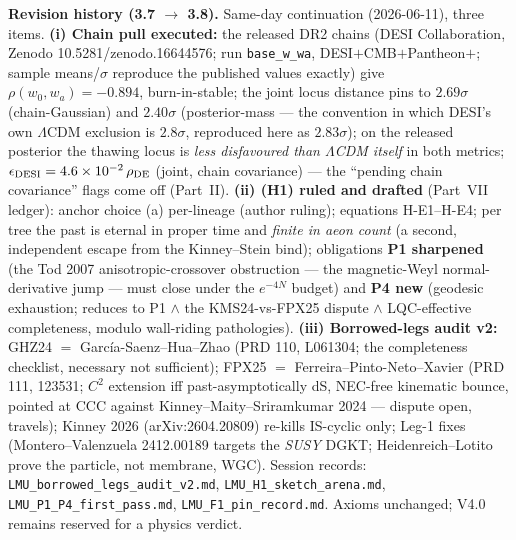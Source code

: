 \documentclass[11pt]{article}
\begin{document}
{\medskip
\noindent\textbf{Revision history (3.7 $\to$ 3.8).} Same-day continuation (2026-06-11), three items. \textbf{(i) Chain pull executed:} the released DR2 chains (DESI Collaboration, Zenodo 10.5281/zenodo.16644576; run \texttt{base\_w\_wa}, DESI$+$CMB$+$Pantheon$+$; sample means/$\sigma$ reproduce the published values exactly) give $\rho(w_0,w_a)=-0.894$, burn-in-stable; the joint locus distance pins to $2.69\sigma$ (chain-Gaussian) and $2.40\sigma$ (posterior-mass --- the convention in which DESI's own $\Lambda$CDM exclusion is $2.8\sigma$, reproduced here as $2.83\sigma$); on the released posterior the thawing locus is \emph{less disfavoured than $\Lambda$CDM itself} in both metrics; $\epsilon_{\rm DESI}=4.6\times10^{-2}\,\rho_{\rm DE}$ (joint, chain covariance) --- the ``pending chain covariance'' flags come off (Part~II). \textbf{(ii) (H1) ruled and drafted} (Part~VII ledger): anchor choice (a) per-lineage (author ruling); equations H-E1--H-E4; per tree the past is eternal in proper time and \emph{finite in aeon count} (a second, independent escape from the Kinney--Stein bind); obligations \textbf{P1 sharpened} (the Tod 2007 anisotropic-crossover obstruction --- the magnetic-Weyl normal-derivative jump --- must close under the $e^{-4N}$ budget) and \textbf{P4 new} (geodesic exhaustion; reduces to P1 $\wedge$ the KMS24-vs-FPX25 dispute $\wedge$ LQC-effective completeness, modulo wall-riding pathologies). \textbf{(iii) Borrowed-legs audit v2:} GHZ24 $=$ Garc\'ia-Saenz--Hua--Zhao (PRD 110, L061304; the completeness checklist, necessary not sufficient); FPX25 $=$ Ferreira--Pinto-Neto--Xavier (PRD 111, 123531; $C^2$ extension iff past-asymptotically dS, NEC-free kinematic bounce, pointed at CCC against Kinney--Maity--Sriramkumar 2024 --- dispute open, travels); Kinney 2026 (arXiv:2604.20809) re-kills IS-cyclic only; Leg-1 fixes (Montero--Valenzuela 2412.00189 targets the \emph{SUSY} DGKT; Heidenreich--Lotito prove the particle, not membrane, WGC). Session records: \texttt{LMU\_borrowed\_legs\_audit\_v2.md}, \texttt{LMU\_H1\_sketch\_arena.md}, \texttt{LMU\_P1\_P4\_first\_pass.md}, \texttt{LMU\_F1\_pin\_record.md}. Axioms unchanged; V4.0 remains reserved for a physics verdict.

}
\end{document}
